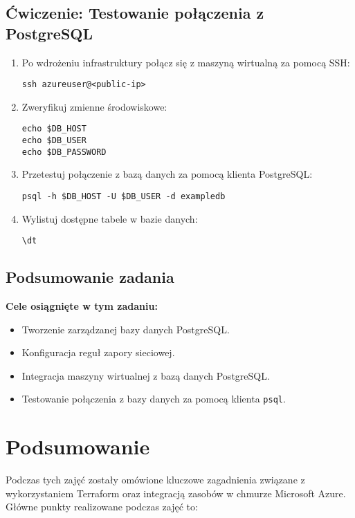 \documentclass{article}
\begin{document}
\subsection{Ćwiczenie: Testowanie połączenia z PostgreSQL}
\begin{enumerate}
    \item Po wdrożeniu infrastruktury połącz się z maszyną wirtualną za pomocą SSH:
    \begin{lstlisting}
ssh azureuser@<public-ip>
    \end{lstlisting}
    \item Zweryfikuj zmienne środowiskowe:
    \begin{lstlisting}
echo $DB_HOST
echo $DB_USER
echo $DB_PASSWORD
    \end{lstlisting}
    \item Przetestuj połączenie z bazą danych za pomocą klienta PostgreSQL:
    \begin{lstlisting}
psql -h $DB_HOST -U $DB_USER -d exampledb
    \end{lstlisting}
    \item Wylistuj dostępne tabele w bazie danych:
    \begin{lstlisting}
\dt
    \end{lstlisting}
\end{enumerate}

\subsection{Podsumowanie zadania}
\textbf{Cele osiągnięte w tym zadaniu:}
\begin{itemize}
    \item Tworzenie zarządzanej bazy danych PostgreSQL.
    \item Konfiguracja reguł zapory sieciowej.
    \item Integracja maszyny wirtualnej z bazą danych PostgreSQL.
    \item Testowanie połączenia z bazy danych za pomocą klienta \texttt{psql}.
\end{itemize}


\section{Podsumowanie}
Podczas tych zajęć zostały omówione kluczowe zagadnienia związane z wykorzystaniem Terraform oraz integracją zasobów w chmurze Microsoft Azure. Główne punkty realizowane podczas zajęć to:
\end{document}
